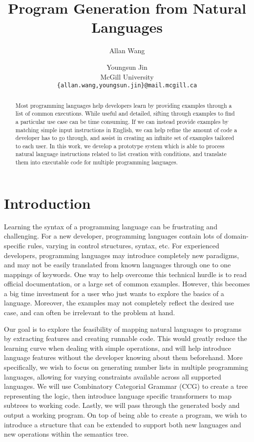 \documentclass[11pt,letterpaper]{article}
\title{Program Generation from Natural Languages}
\author{Allan Wang \and Youngsun Jin \\
        McGill University \\ \tt{\{allan.wang,youngsun.jin\}@mail.mcgill.ca}}
\date{}
\begin{document}
\maketitle

\begin{abstract}
  Most programming languages help developers learn by providing examples through a list of common executions. 
  While useful and detailed, sifting through examples to find a particular use case can be time consuming.
  If we can instead provide examples by matching simple input instructions in English, we can help refine the amount of code a developer has to go through, and assist in creating an infinite set of examples tailored to each user. 
  In this work, we develop a prototype system which is able to process natural language instructions related to list creation with conditions, and translate them into executable code for multiple programming languages.
\end{abstract}

\section{Introduction}
Learning the syntax of a programming language can be frustrating and challenging. 
For a new developer, programming languages contain lots of domain-specific rules, varying in control structures, syntax, etc.
For experienced developers, programming languages may introduce completely new paradigms, and may not be easily translated from known languages through one to one mappings of keywords.
One way to help overcome this technical hurdle is to read official documentation, or a large set of common examples.
However, this becomes a big time investment for a user who just wants to explore the basics of a language.
Moreover, the examples may not completely reflect the desired use case, and can often be irrelevant to the problem at hand.

Our goal is to explore the feasibility of mapping natural languages to programs by extracting features and creating runnable code.
This would greatly reduce the learning curve when dealing with simple operations, and will help introduce language features without the developer knowing about them beforehand.
More specifically, we wish to focus on generating number lists in multiple programming languages, allowing for varying constraints available across all supported languages.
We will use Combinatory Categorial Grammar (CCG) to create a tree representing the logic, then introduce language specific transformers to map subtrees to working code.
Lastly, we will pass through the generated body and output a working program.
On top of being able to create a program, we wish to introduce a structure that can be extended to support both new languages and new operations within the semantics tree.
\end{document}
